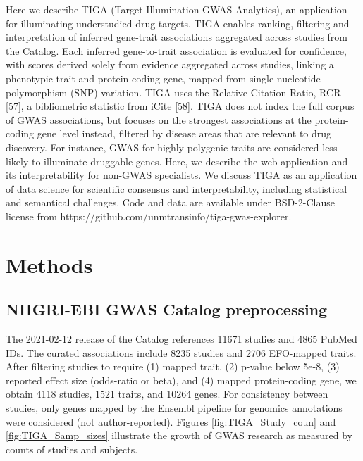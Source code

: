 Here we describe TIGA (Target Illumination GWAS Analytics), an application for illuminating understudied drug targets. TIGA enables ranking, filtering and interpretation of inferred gene-trait associations aggregated across studies from the Catalog. Each inferred gene-to-trait association is evaluated for confidence, with scores derived solely from evidence aggregated across studies, linking a phenotypic trait and protein-coding gene, mapped from single nucleotide polymorphism (SNP) variation. TIGA uses the Relative Citation Ratio, RCR [57], a bibliometric statistic from iCite [58]. TIGA does not index the full corpus of GWAS associations, but focuses on the strongest associations at the protein-coding gene level instead, filtered by disease areas that are relevant to drug discovery. For instance, GWAS for highly polygenic traits are considered less likely to illuminate druggable genes. Here, we describe the web application and its interpretability for non-GWAS specialists. We discuss TIGA as an application of data science for scientific consensus and interpretability, including statistical and semantical challenges. Code and data are available under BSD-2-Clause license from https://github.com/unmtransinfo/tiga-gwas-explorer.

\section{Methods}

\subsection{NHGRI-EBI GWAS Catalog preprocessing}

The 2021-02-12 release of the Catalog references 11671 studies and 4865 PubMed IDs. The curated associations include 8235 studies and 2706 EFO-mapped traits. After filtering studies to require (1) mapped trait, (2) p-value below 5e-8, (3) reported effect size (odds-ratio or beta), and (4) mapped protein-coding gene, we obtain 4118 studies, 1521 traits, and 10264 genes. For consistency between studies, only genes mapped by the Ensembl pipeline for genomics annotations were considered (not author-reported). Figures \ref{fig:TIGA_Study_coun} and \ref{fig:TIGA_Samp_sizes} illustrate the growth of GWAS research as measured by counts of studies and subjects.  

